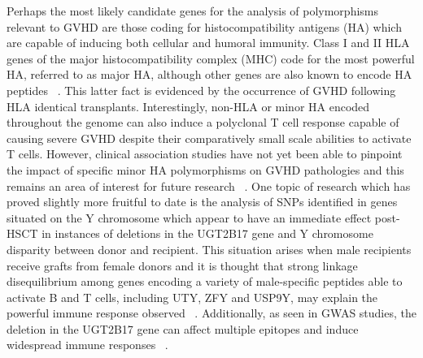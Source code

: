 Perhaps the most likely candidate genes for the analysis of polymorphisms relevant to GVHD are those coding for histocompatibility antigens (HA) which are capable of inducing both cellular and humoral immunity. Class I and II HLA genes of the major histocompatibility complex (MHC) code for the most powerful HA, referred to as major HA, although other genes are also known to encode HA peptides ~\autocite{Han2010}. This latter fact is evidenced by the occurrence of GVHD following HLA identical transplants. Interestingly, non-HLA or minor HA encoded throughout the genome can also induce a polyclonal T cell response capable of causing severe GVHD despite their comparatively small scale abilities to activate T cells. However, clinical association studies have not yet been able to pinpoint the impact of specific minor HA polymorphisms on GVHD pathologies and this remains an area of interest for future research ~\autocite{Han2010}. One topic of research which has proved slightly more fruitful to date is the analysis of SNPs identified in genes situated on the Y chromosome which appear to have an immediate effect post-HSCT in instances of deletions in the UGT2B17 gene and Y chromosome disparity between donor and recipient. This situation arises when male recipients receive grafts from female donors and it is thought that strong linkage disequilibrium among genes encoding a variety of male-specific peptides able to activate B and T cells, including UTY, ZFY and USP9Y, may explain the powerful immune response observed ~\autocite{Han2010}. Additionally, as seen in GWAS studies, the deletion in the UGT2B17 gene can affect multiple epitopes and induce widespread immune responses ~\autocite{Tin2013,Han2010}. 

